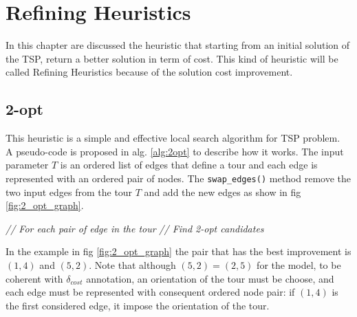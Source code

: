 \chapter{Refining Heuristics}
In this chapter are discussed the heuristic that starting from an initial solution of the TSP, return a better solution in term of cost. This kind of heuristic will be called Refining Heuristics because of the solution cost improvement. 

\section{2-opt} \label{sec:best_2_opt}

This heuristic is a simple and effective local search algorithm for TSP problem.\\
A pseudo-code is proposed in alg. \ref{alg:2opt} to describe how it works. The input parameter $ T $ is an ordered list of edges that define a tour and each edge is represented with an ordered pair of nodes. The \texttt{swap\_edges()} method remove the two input edges from the tour $ T $ and add the new edges as show in fig \ref{fig:2_opt_graph}.

\begin{algorithm}
	\caption{}\label{alg:2opt}
	\begin{algorithmic}[1]
			 \textit{ // For each pair of edge in the tour}
				\EndIf
				 \textit{ // Find 2-opt candidates}
				\EndIf
			\EndFor
		\EndFor
	\EndProcedure
	\end{algorithmic}
\end{algorithm}

In the example in fig \ref{fig:2_opt_graph} the pair that has the best improvement is $ (1,4) $ and $ (5,2) $. Note that although $ (5,2) = (2,5) $ for the model, to be coherent with $ \delta_{cost} $ annotation, an orientation of the tour must be choose, and each edge must be represented with consequent ordered node pair: if $ (1,4) $ is the first considered edge, it impose the orientation of the tour.

